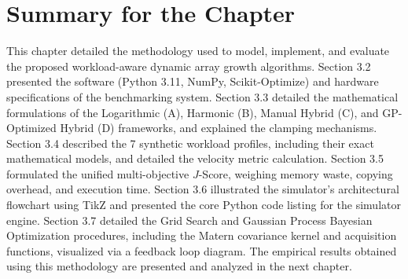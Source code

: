 \section{Summary for the Chapter}
This chapter detailed the methodology used to model, implement, and evaluate 
the proposed workload-aware dynamic array growth algorithms. Section 3.2 
presented the software (Python 3.11, NumPy, Scikit-Optimize) and hardware 
specifications of the benchmarking system. Section 3.3 detailed the mathematical 
formulations of the Logarithmic (A), Harmonic (B), Manual Hybrid (C), and 
GP-Optimized Hybrid (D) frameworks, and explained the clamping mechanisms. Section 
3.4 described the 7 synthetic workload profiles, including their exact mathematical 
models, and detailed the velocity metric calculation. Section 3.5 formulated the 
unified multi-objective $J$-Score, weighing memory waste, copying overhead, and 
execution time. Section 3.6 illustrated the simulator's architectural flowchart 
using TikZ and presented the core Python code listing for the simulator engine. 
Section 3.7 detailed the Grid Search and Gaussian Process Bayesian Optimization 
procedures, including the Matern covariance kernel and acquisition functions, 
visualized via a feedback loop diagram. The empirical results obtained using this 
methodology are presented and analyzed in the next chapter.
